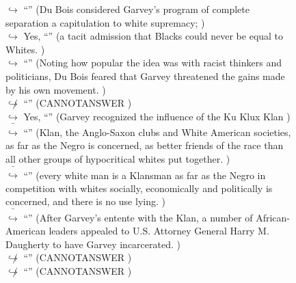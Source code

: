 \documentclass[11pt,a4paper, onecolumn]{article}
\begin{document}
\begin{figure}[t] \small \begin{tcolorbox}[boxsep=0pt,left=5pt,right=0pt,top=2pt,colback = yellow!5] \begin{dialogue}
 \small 
\colorbox{pink!25}{$\hookrightarrow$}
{ ``'' (Du Bois considered Garvey's program of complete separation a capitulation to white supremacy; ) }
\\
\colorbox{pink!25}{$\hookrightarrow$}
\colorbox{red!25}{Yes,}
{ ``'' (a tacit admission that Blacks could never be equal to Whites. ) }
\\
\colorbox{pink!25}{$\hookrightarrow$}
{ ``'' (Noting how popular the idea was with racist thinkers and politicians, Du Bois feared that Garvey threatened the gains made by his own movement. ) }
\\
\colorbox{pink!25}{$\not\hookrightarrow$}
{ ``'' (CANNOTANSWER ) }
\\
\colorbox{pink!25}{$\hookrightarrow$}
\colorbox{red!25}{Yes,}
{ ``'' (Garvey recognized the influence of the Ku Klux Klan ) }
\\
\colorbox{pink!25}{ $\bar{\hookrightarrow}$}
{ ``'' (Klan, the Anglo-Saxon clubs and White American societies, as far as the Negro is concerned, as better friends of the race than all other groups of hypocritical whites put together. ) }
\\
\colorbox{pink!25}{ $\bar{\hookrightarrow}$}
{ ``'' (every white man is a Klansman as far as the Negro in competition with whites socially, economically and politically is concerned, and there is no use lying. ) }
\\
\colorbox{pink!25}{ $\bar{\hookrightarrow}$}
{ ``'' (After Garvey's entente with the Klan, a number of African-American leaders appealed to U.S. Attorney General Harry M. Daugherty to have Garvey incarcerated. ) }
\\
\colorbox{pink!25}{$\not\hookrightarrow$}
{ ``'' (CANNOTANSWER ) }
\\
\colorbox{pink!25}{$\not\hookrightarrow$}
{ ``'' (CANNOTANSWER ) }
\\
 \end{dialogue}\end{tcolorbox}\end{figure}
\end{document}

